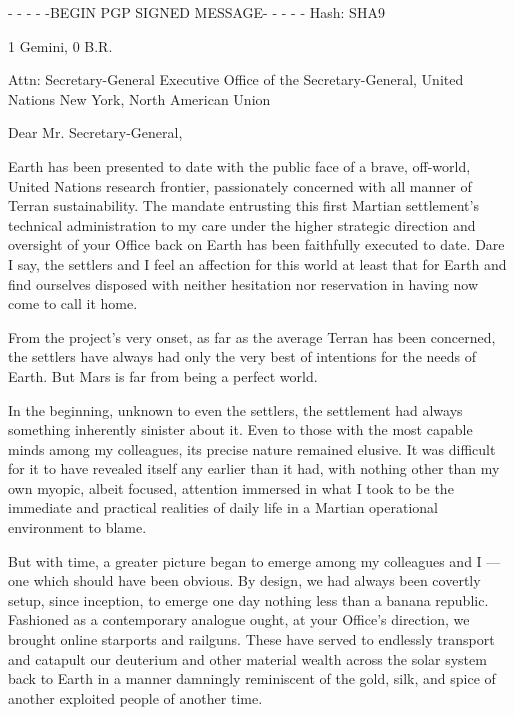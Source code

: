 
\startlines
- - - - -BEGIN PGP SIGNED MESSAGE- - - - -
Hash: SHA9

1 Gemini, 0 B.R.

Attn: Secretary-General
Executive Office of the Secretary-General, United Nations
New York, North American Union
\blank

Dear Mr. Secretary-General,

Earth has been presented to date with the public face of a brave, off-world, United Nations research frontier, passionately concerned with all manner of Terran sustainability. The mandate entrusting this first Martian settlement's technical administration to my care under the higher strategic direction and oversight of your Office back on Earth has been faithfully executed to date. Dare I say, the settlers and I feel an affection for this world at least that for Earth and find ourselves disposed with neither hesitation nor reservation in having now come to call it home.

From the project's very onset, as far as the average Terran has been concerned, the settlers have always had only the very best of intentions for the needs of Earth. But Mars is far from being a perfect world. 

In the beginning, unknown to even the settlers, the settlement had always something inherently sinister about it. Even to those with the most capable minds among my colleagues, its precise nature remained elusive. It was difficult for it to have revealed itself any earlier than it had, with nothing other than my own myopic, albeit focused, attention immersed in what I took to be the immediate and practical realities of daily life in a Martian operational environment to blame.

But with time, a greater picture began to emerge among my colleagues and I — one which should have been obvious. By design, we had always been covertly setup, since inception, to emerge one day nothing less than a banana republic. Fashioned as a contemporary analogue ought, at your Office's direction, we brought online starports and railguns. These have served to endlessly transport and catapult our deuterium and other material wealth across the solar system back to Earth in a manner damningly reminiscent of the gold, silk, and spice of another exploited people of another time.

